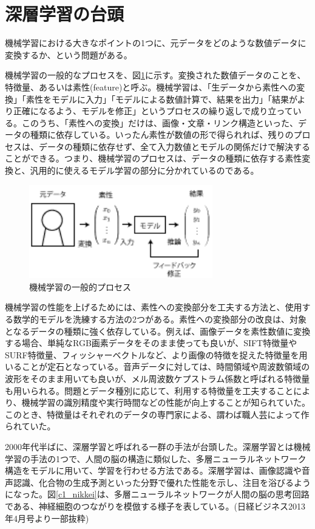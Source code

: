 \section{深層学習の台頭}
機械学習における大きなポイントの1つに、元データをどのような数値データに変換するか、という問題がある。\par
機械学習の一般的なプロセスを、図\ref{c1_ml}に示す。変換された数値データのことを、 特徴量、あるいは素性(feature)と呼ぶ。機械学習は、「生データから素性への変換」「素性をモデルに入力」「モデルによる数値計算で、結果を出力」「結果がより正確になるよう、モデルを修正」というプロセスの繰り返しで成り立っている。このうち、「素性への変換」だけは、画像・文章・リンク構造といった、データの種類に依存している。いったん素性が数値の形で得られれば、残りのプロセスは、データの種類に依存せず、全て入力数値とモデルの関係だけで解決することができる。つまり、機械学習のプロセスは、データの種類に依存する素性変換と、汎用的に使えるモデル学習の部分に分かれているのである。
\begin{figure}[tbp]
 \centering
  \includegraphics[width=80mm]{img/c1/ml}
 \caption{機械学習の一般的プロセス}
 \label{c1_ml}
\end{figure}
\par
機械学習の性能を上げるためには、素性への変換部分を工夫する方法と、使用する数学的モデルを洗練する方法の2つがある。素性への変換部分の改良は、対象となるデータの種類に強く依存している。例えば、画像データを素性数値に変換する場合、単純なRGB画素データをそのまま使っても良いが、SIFT特徴量\cite{lowe1999object}やSURF特徴量\cite{bay2008speeded}、フィッシャーベクトル\cite{perronnin2007fisher}など、より画像の特徴を捉えた特徴量を用いることが定石となっている。音声データに対しては、時間領域や周波数領域の波形をそのまま用いても良いが、メル周波数ケプストラム係数と呼ばれる特徴量も用いられる。問題とデータ種別に応じて、利用する特徴量を工夫することにより、機械学習の識別精度や実行時間などの性能が向上することが知られていた。このとき、特徴量はそれぞれのデータの専門家による、謂わば職人芸によって作られていた。\par
2000年代半ばに、深層学習と呼ばれる一群の手法が台頭した。深層学習とは機械学習の手法の1つで、人間の脳の構造に類似した、多層ニューラルネットワーク構造をモデルに用いて、学習を行わせる方法である。深層学習は、画像認識や音声認識、化合物の生成予測といった分野で優れた性能を示し、注目を浴びるようになった。図\ref{c1_nikkei}は、多層ニューラルネットワークが人間の脳の思考回路である、神経細胞のつながりを模倣する様子を表している。(日経ビジネス2013年4月号より一部抜粋)\\
